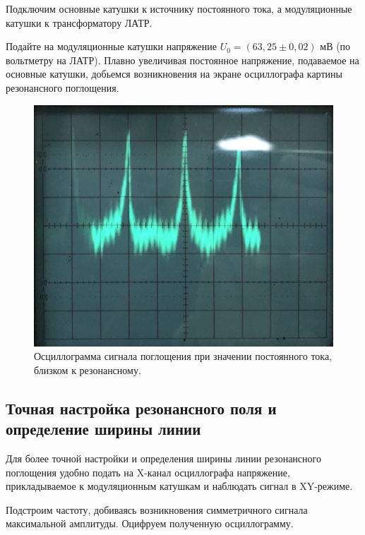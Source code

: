 \documentclass[a4paper,12pt]{article} %
\begin{document}
\noindent Подключим основные катушки к источнику постоянного тока, а модуляционные катушки к трансформатору ЛАТР.

\medskip

\noindent Подайте на модуляционные катушки напряжение $U_0 = (63,25 \pm 0,02) \text{ мВ}$ (по вольтметру на ЛАТР). Плавно увеличивая постоянное напряжение, подаваемое на основные катушки, добьемся возникновения на экране осциллографа картины резонансного поглощения.

\medskip

\begin{figure}[h!]

\includegraphics[scale=0.25]{осц.jpg} 
\caption{Осциллограмма сигнала поглощения при значении постоянного тока, близком к резонансному.}
\end{figure}

\subsection{Точная настройка резонансного поля и определение ширины линии}

\noindent Для более точной настройки и определения ширины линии резонансного поглощения удобно
подать на X-канал осциллографа напряжение, прикладываемое к модуляционным катушкам и
наблюдать сигнал в XY-режиме. 

\medskip

\noindent Подстроим частоту, добиваясь возникновения симметричного сигнала максимальной амплитуды. Оцифруем полученную осциллограмму.
\end{document}
